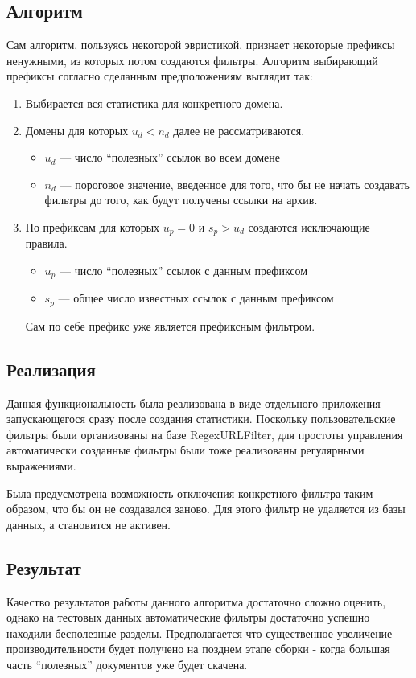 \subsection{Алгоритм}
Сам алгоритм, пользуясь некоторой эвристикой, признает некоторые префиксы ненужными, из которых потом создаются фильтры.
Алгоритм выбирающий префиксы согласно сделанным предположениям выглядит так:
\begin{enumerate}
 \item Выбирается вся статистика для конкретного домена.
 \item Домены для которых $u_{d}<n_{d}$ далее не рассматриваются.
 \begin{itemize}
  \item $u_{d}$ --- число ``полезных'' ссылок во всем домене
  \item $n_{d}$ --- пороговое значение, введенное для того, что бы не начать создавать фильтры до того, как будут получены ссылки на архив.
 \end{itemize}

 \item По префиксам для которых $u_{p}=0$ и $s_{p}>u_{d}$ создаются исключающие правила.
 \begin{itemize}
  \item $u_{p}$ --- число ``полезных'' ссылок с данным префиксом
  \item $s_{p}$ --- общее число известных ссылок с данным префиксом
 \end{itemize}
 Сам по себе префикс уже является префиксным фильтром.
\end{enumerate}


\subsection{Реализация}
Данная функциональность была реализована в виде отдельного приложения запускающегося сразу после создания статистики. Поскольку пользовательские фильтры были организованы на базе RegexURLFilter, для простоты управления автоматически созданные фильтры были тоже реализованы регулярными выражениями. 

Была предусмотрена возможность отключения конкретного фильтра таким образом, что бы он не создавался заново. Для этого фильтр не удаляется из базы данных, а становится не активен.

\subsection{Результат}
Качество результатов работы данного алгоритма достаточно сложно оценить, однако на тестовых данных автоматические фильтры достаточно успешно находили бесполезные разделы. Предполагается что существенное увеличение производительности будет получено на позднем этапе сборки - когда большая часть ``полезных'' документов уже будет скачена.
